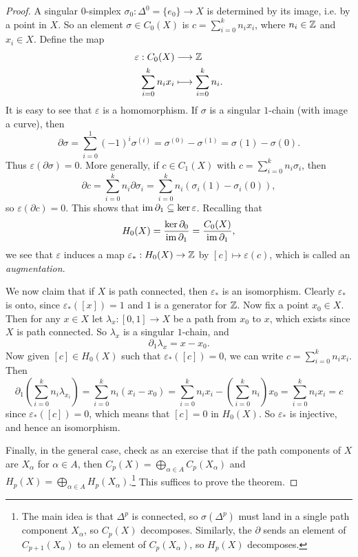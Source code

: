 \begin{proof}
  A singular $0$-simplex $\sigma_0 : \Delta^0 = \{e_0\} \to X$
  is determined by its image, i.e. by a point in $X$.
  So an element $\sigma \in C_0(X)$ is
  $c = \sum_{i = 0}^k n_i x_i$, where
  $n_i \in \mathbb{Z}$ and $x_i \in X$. Define the map
  \begin{align*}
    \varepsilon : C_0(X) &\longrightarrow \mathbb{Z} \\
    \sum_{i = 0}^k n_i x_i &\longmapsto \sum_{i = 0}^k n_i.
  \end{align*}
  It is easy to see that $\varepsilon$ is a homomorphism.
  If $\sigma$ is a singular $1$-chain (with image a
  curve), then
  \[
    \partial \sigma = \sum_{i = 0}^1 (-1)^i \sigma^{(i)}
    = \sigma^{(0)} - \sigma^{(1)}
    = \sigma(1) - \sigma(0).
  \]
  Thus $\varepsilon (\partial \sigma) = 0$.
  More generally, if $c \in C_1(X)$ with
  $c = \sum_{i = 0}^k n_i \sigma_i$, then
  \[
    \partial c = \sum_{i = 0}^k n_i \partial \sigma_i
    = \sum_{i = 0}^k n_i (\sigma_i(1) - \sigma_i(0)),
  \]
  so $\varepsilon (\partial c) = 0$. This shows that
  $\operatorname{im} \partial_1 \subseteq \ker \varepsilon$.
  Recalling that
  \[
    H_0(X) = \frac{\ker \partial_0}{\operatorname{im} \partial_1}
    = \frac{C_0(X)}{\operatorname{im} \partial_1},
  \]
  we see that $\varepsilon$ induces a map
  $\varepsilon_* : H_0(X) \to \mathbb{Z}$ by
  $[c] \mapsto \varepsilon(c)$, which is
  called an \emph{augmentation}.

  We now claim that if $X$ is path connected, then
  $\varepsilon_*$ is an isomorphism. Clearly
  $\varepsilon_*$ is onto, since
  $\varepsilon_*([x]) = 1$ and $1$ is a generator
  for $\mathbb{Z}$. Now fix a point $x_0 \in X$. Then
  for any $x \in X$ let $\lambda_x : [0, 1] \to X$
  be a path from $x_0$ to $x$, which exists since
  $X$ is path connected. So $\lambda_x$ is a singular
  $1$-chain, and
  \[
    \partial_1 \lambda_x = x - x_0.
  \]
  Now given $[c] \in H_0(X)$ such that
  $\varepsilon_*([c]) = 0$, we can write
  $c = \sum_{i = 0}^k n_i x_i$. Then
  \[
    \partial_1 \left(\sum_{i = 0}^k n_i \lambda_{x_i}\right)
    = \sum_{i = 0}^k n_i (x_i - x_0)
    = \sum_{i = 0}^k n_i x_i - \left(\sum_{i = 0}^k n_i\right) x_0
    = \sum_{i = 0}^k n_i x_i
    = c
  \]
  since $\varepsilon_*([c]) = 0$, which means that
  $[c] = 0$ in $H_0(X)$. So $\varepsilon_*$ is
  injective, and hence an isomorphism.

  Finally, in the general case, check as an exercise
  that if the path components of $X$ are $X_{\alpha}$
  for $\alpha \in A$, then
  $C_p(X) = \bigoplus_{\alpha \in A} C_p(X_{\alpha})$
  and $H_p(X) = \bigoplus_{\alpha \in A} H_p(X_{\alpha})$.\footnote{The main idea is that $\Delta^p$ is connected, so $\sigma(\Delta^p)$ must land in a single path component $X_\alpha$, so $C_p(X)$ decomposes. Similarly, the $\partial$ sends an element of $C_{p + 1}(X_\alpha)$ to an element of $C_{p}(X_\alpha)$, so $H_p(X)$ decomposes.} This suffices to prove the theorem.
\end{proof}

